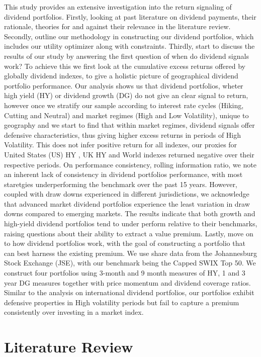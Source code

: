 \documentclass[11pt,preprint, authoryear]{elsarticle}
\numberwithin{equation}{section}
\numberwithin{figure}{section}
\numberwithin{table}{section}
\begin{document}
This study provides an extensive investigation into the return signaling
of dividend portfolios. Firstly, looking at past literature on dividend
payments, their rationale, theories for and against their relevance in
the literature review. Secondly, outline our methodology in constructing
our dividend portfolios, which includes our utility optimizer along with
constraints. Thirdly, start to discuss the results of our study by
answering the first question of when do dividend signals work? To
achieve this we first look at the cumulative excess returns offered by
globally dividend indexes, to give a holistic picture of geographical
dividend portfolio performance. Our analysis shows us that dividend
portfolios, wheter high yield (HY) or dividend growth (DG) do not give
an clear signal to return, however once we stratify our sample according
to interest rate cycles (Hiking, Cutting and Neutral) and market regimes
(High and Low Volatility), unique to geography and we start to find that
within market regimes, dividend signals offer defensive characteristics,
thus giving higher excess returns in periods of High Volatility. This
does not infer positive return for all indexes, our proxies for United
States (US) HY , UK HY and World indexes returned negative over their
respective periods. On performance consistency, rolling information
ratio, we note an inherent lack of consistency in dividend portfolios
performance, with most staretgies underperforming the benchmark over the
past 15 years. However, coupled with draw downs experienced in different
jurisdictions, we acknowledge that advanced market dividend portfolios
experience the least variation in draw downs compared to emerging
markets. The results indicate that both growth and high-yield dividend
portfolios tend to under perform relative to their benchmarks, raising
questions about their ability to extract a value premium. Lastly, move
on to how dividend portfolios work, with the goal of constructing a
portfolio that can best harness the existing premium. We use share data
from the Johannesburg Stock Exchange (JSE), with our benchmark being the
Capped SWIX Top 50. We construct four portfolios using 3-month and 9
month measures of HY, 1 and 3 year DG measures together with price
momentum and dividend coverage ratios. Similar to the analysis on
international dividend portfolios, our portfolios exhibit defensive
properties in High volatility periods but fail to capture a premium
consistently over investing in a market index.

\hypertarget{literature-review}{%
\section*{Literature Review}\label{literature-review}}
\end{document}
